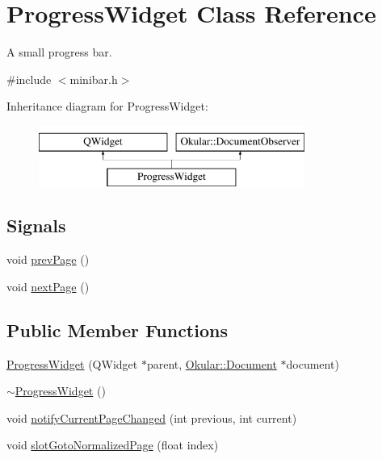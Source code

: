 \hypertarget{classProgressWidget}{\section{Progress\+Widget Class Reference}
\label{classProgressWidget}
}


A small progress bar.  




{\ttfamily \#include $<$minibar.\+h$>$}

Inheritance diagram for Progress\+Widget\+:\begin{figure}[H]
\begin{center}
\leavevmode
\includegraphics[height=2.000000cm]{classProgressWidget}
\end{center}
\end{figure}
\subsection*{Signals}
\begin{DoxyCompactItemize}
\item 
void \hyperlink{classProgressWidget_a2c52151e2281d61edb9fab878b7a269d}{prev\+Page} ()
\item 
void \hyperlink{classProgressWidget_a2bd3763381658d30420a05540100322c}{next\+Page} ()
\end{DoxyCompactItemize}
\subsection*{Public Member Functions}
\begin{DoxyCompactItemize}
\item 
\hyperlink{classProgressWidget_a070e0775236d1e9a01c53577d1e982d6}{Progress\+Widget} (Q\+Widget $\ast$parent, \hyperlink{classOkular_1_1Document}{Okular\+::\+Document} $\ast$document)
\item 
\hyperlink{classProgressWidget_a52d6a1fc716dec6132439682644dab48}{$\sim$\+Progress\+Widget} ()
\item 
void \hyperlink{classProgressWidget_a2458a226f1768d356ee94bdfaeebdfdd}{notify\+Current\+Page\+Changed} (int previous, int current)
\item 
void \hyperlink{classProgressWidget_ad3ae9ff881ea01ce6f9734ebaf529655}{slot\+Goto\+Normalized\+Page} (float index)
\end{DoxyCompactItemize}

